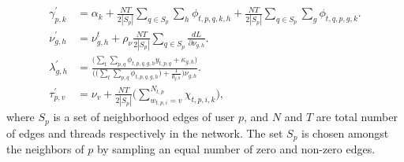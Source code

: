 \documentclass{sig-alternate}
\begin{document}
{\small
\begin{align}
\gamma_{p,k}^{'} &= \alpha_{k} + \frac{NT}{2|S_p|}\sum_{q \in S_p} \sum_{h}
\! \phi_{t,p,q,k,h} + \frac{NT}{2|S_p|}\sum_{q \in S_p} \! \sum_{g} \!
\phi_{t,q,p,g,k}. 
\label{eqn:gammaUpStoc}
\\
\nu_{g,h}^{'} &= \nu_{g,h}^{t}+\rho_\nu \frac{NT}{2|S_p|}\sum_{q \in
S_p}\frac{dL}{\partial\nu_{g,h}}.
\label{eqn:nuUpStoc}
\\
\lambda_{g,h}^{'} &= \frac{\bigg( \sum_{t} \! \sum_{p,q} \! \phi_{t,p,q,g,h}
y_{t,p,q} + \kappa_{g,h} \bigg) }{
 \bigg( \bigg( \sum_{t} \! \sum_{p,q} \! \phi_{t,p,q,g,h} \bigg) + 
\frac{1}{\theta_{g,h}} \bigg) \nu_{g,h}}.
\label{eqn:lambdaUpStoc}
\\
\tau_{p,v}^{'} &= \nu_{v} + \frac{NT}{2|S_p|} 
\bigg(\sum_{w_{t,p,i}=v}^{N_{t,p}} \chi_{t,p,i,k} \bigg),
\label{eqn:tauUpStoc}
\end{align} 
}
where $S_p$ is a set of neighborhood edges of user $p$, and $N$ and $T$ are
total number of edges and threads respectively in the network. The set $S_p$ is
chosen amongst the neighbors of $p$ by sampling an equal number of zero and non-zero
edges. 

\normalsize
\IncMargin{1em}
\end{document}

